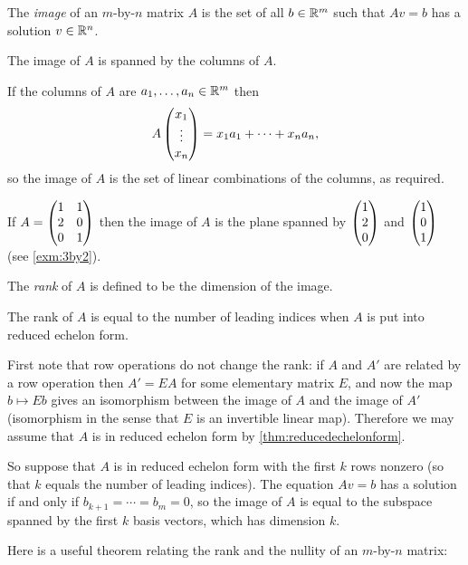 \documentclass{article}
\begin{document}
\begin{Definition}
The {\em image} of an \(m\)-by-\(n\) matrix \(A\) is the set of all
\(b\in\mathbb{R}^m\) such that \(Av=b\) has a solution \(v\in\mathbb{R}^n\).


\end{Definition}
\begin{Lemma}
The image of \(A\) is spanned by the columns of \(A\).
\end{Lemma}
\begin{Proof}
If the columns of \(A\) are \(a_1,\ldots,a_n\in\mathbb{R}^m\) then \[A\begin{pmatrix}
x_1 \\ \vdots \\ x_n\end{pmatrix}=x_1a_1+\cdots+x_na_n,\] so the image of
\(A\) is the set of linear combinations of the columns, as
required. \qedhere


\end{Proof}
\begin{Example}
If \(A=\begin{pmatrix} 1 & 1 \\ 2 & 0 \\ 0 & 1\end{pmatrix}\) then the image of \(A\) is
the plane spanned by \(\begin{pmatrix} 1 \\ 2 \\ 0\end{pmatrix}\) and \(\begin{pmatrix} 1 \\ 0
\\ 1\end{pmatrix}\) (see \cref{exm:3by2}).


\end{Example}
\begin{Definition}
The {\em rank} of \(A\) is defined to be the dimension of the
image.


\end{Definition}
\begin{Theorem}\label{thm:rank}
The rank of \(A\) is equal to the number of leading indices when
\(A\) is put into reduced echelon form.
\end{Theorem}
\begin{Proof}
First note that row operations do not change the rank: if \(A\) and
\(A'\) are related by a row operation then \(A'=EA\) for some
elementary matrix \(E\), and now the map \(b\mapsto Eb\) gives an
isomorphism between the image of \(A\) and the image of \(A'\)
(isomorphism in the sense that \(E\) is an invertible linear
map). Therefore we may assume that \(A\) is in reduced echelon form
by \cref{thm:reducedechelonform}.


So suppose that \(A\) is in reduced echelon form with the first
\(k\) rows nonzero (so that \(k\) equals the number of leading
indices). The equation \(Av=b\) has a solution if and only if
\(b_{k+1}=\cdots=b_m=0\), so the image of \(A\) is equal to the
subspace spanned by the first \(k\) basis vectors, which has
dimension \(k\). \qedhere


\end{Proof}
Here is a useful theorem relating the rank and the nullity of an
\(m\)-by-\(n\) matrix:
\end{document}
